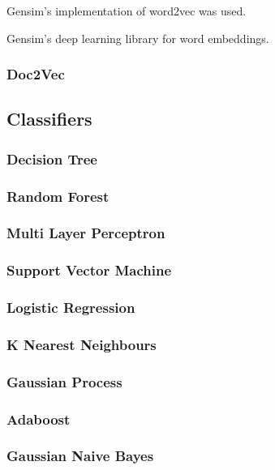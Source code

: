 Gensim's implementation of word2vec was used.

Gensim's deep learning library for word embeddings.

\subsubsection*{Doc2Vec}

\subsection*{Classifiers}

\subsubsection*{Decision Tree}

\subsubsection*{Random Forest}

\subsubsection*{Multi Layer Perceptron}

\subsubsection*{Support Vector Machine}

\subsubsection*{Logistic Regression}

\subsubsection*{K Nearest Neighbours}

\subsubsection*{Gaussian Process}

\subsubsection*{Adaboost}

\subsubsection*{Gaussian Naive Bayes}


